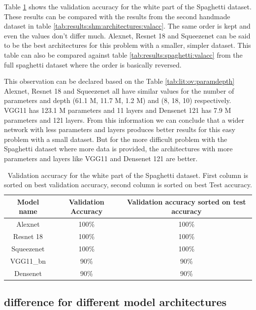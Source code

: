 	Table \ref{tab:results:comparison:valacc} shows the validation accuracy for the white part of the Spaghetti dataset. These results can be compared with the results from the second handmade dataset in table \ref{tab:results:shm:architectures:valacc}. The same order is kept and even the values don't differ much. Alexnet, Resnet 18 and Squeezenet can be said to be the best architectures for this problem with a smaller, simpler dataset.
	This table can also be compared against table \ref{tab:results:spaghetti:valacc} from the full spaghetti dataset where the order is basically reversed. 
	
	This observation can be declared based on the Table \ref{tab:lit:ov:paramdepth} 
	Alexnet, Resnet 18 and Squeezenet all have similar values for the number of parameters and depth (61.1 M, 11.7 M, 1.2 M) and (8, 18, 10) respectively. VGG11 has 123.1 M parameters and 11 layers and Densenet 121 has 7.9 M parameters and 121 layers. From this information we can conclude that a wider network with less parameters and layers produces better results for this easy problem with a small dataset. 
	But for the more difficult problem with the Spaghetti dataset where more data is provided, the architectures with more parameters and layers like VGG11 and Densenet 121 are better. 
	
	\begin{table}[!ht]
		\centering
		\caption{Validation accuracy for the white part of the Spaghetti dataset. First column is sorted on best validation accuracy, second column is sorted on best Test accuracy.}
		\begin{tabular}{ c | c c }
			Model name		& Validation Accuracy 	& Validation accuracy sorted on test accuracy	\\ \hline
			Alexnet			& 100\%							& 100\%					\\
			Resnet 18 		& 100\%						& 100\%					\\
		 	Squeezenet			& 100\%							& 100\%					\\
			VGG11\_bn 			& 90\%						& 90\%					\\
		 	Densenet 				& 90\%						& 90\% 				\\ 
		\end{tabular}
		\label{tab:results:comparison:valacc}
	\end{table}
		
\subsection{difference for different model architectures}

